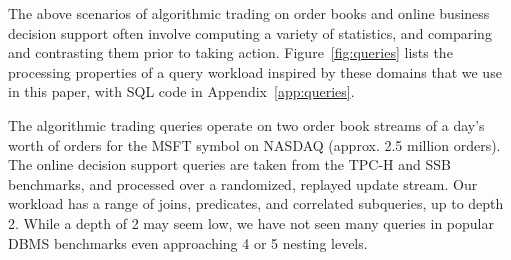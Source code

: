\vspace{1mm}
The above scenarios of algorithmic trading on order books and online
business decision support often involve computing a variety of statistics,
and comparing and contrasting them prior to taking action.
Figure~\ref{fig:queries} lists the processing properties of a query workload
inspired by these domains that we use in this paper, with SQL code in
Appendix~\ref{app:queries}.

The algorithmic trading queries operate on two order book streams of a day's
worth of orders for the MSFT symbol on NASDAQ (approx. 2.5 million orders). The
online decision support queries are taken from the TPC-H and SSB benchmarks, and
processed over a randomized, replayed update stream.
Our workload has a range of joins, predicates, and correlated
subqueries, up to depth 2. While a depth of 2 may seem low, we have not seen
many queries in popular DBMS benchmarks even approaching 4 or 5 nesting levels.

